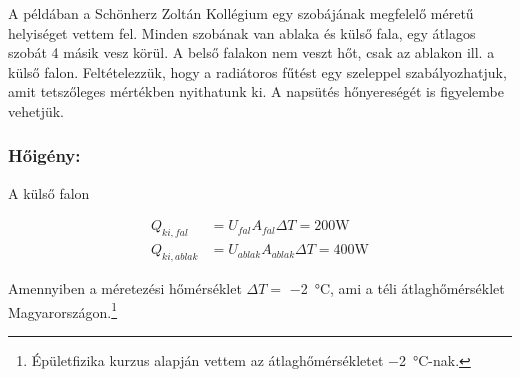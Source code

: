  A példában a Schönherz Zoltán Kollégium egy szobájának megfelelő méretű helyiséget vettem fel. Minden szobának van ablaka és külső fala, egy átlagos szobát 4 másik vesz körül. A belső falakon nem veszt hőt, csak az ablakon ill. a külső falon. Feltételezzük, hogy a radiátoros fűtést egy szeleppel szabályozhatjuk, amit tetszőleges mértékben nyithatunk ki.
 A napsütés hőnyereségét is figyelembe vehetjük.%


\subsubsection*{Hőigény:}

A külső falon

\begin{equation}\label{eq_hoigeny}
\begin{aligned}
		Q_{ki,fal} &= U_{fal}A_{fal}\Delta T = 200\si{\watt}\\[10pt]
		Q_{ki,ablak} &= U_{ablak}A_{ablak}\Delta T = 400\si{\watt}
\end{aligned}
\end{equation}

Amennyiben a méretezési hőmérséklet $\Delta T=$ \SI{-2}{\celsius}, ami a téli átlaghőmérséklet Magyarországon.\footnote{Épületfizika kurzus alapján vettem az átlaghőmérsékletet \SI{-2}{\celsius}-nak.}








